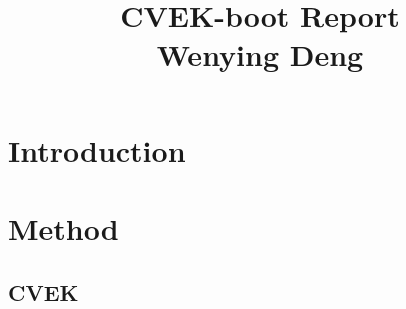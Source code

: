 \documentclass[11pt]{article}
\begin{document}
\setlength{\parindent}{0pt}

\title{CVEK-boot Report\\Wenying Deng \vspace{-1ex}}

\pretitle{\begin{flushright}\normalsize}
\posttitle{\par\end{flushright}}
\author{}
\date{}
\vspace{-10em}
\maketitle
\vspace{-8em}


\tableofcontents
\clearpage
\vspace{2em}
\section{{\bf Introduction}}
\section{{\bf Method}}
\subsection{\textbf{CVEK}}
\setcounter{equation}{0}
\renewcommand{\theequation}{2.1.\arabic{equation}}
\end{document}
